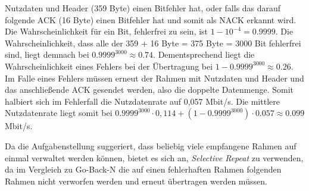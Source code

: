 \documentclass{../exercisesheet}
\begin{document}
\begin{exercise}{4}
\begin{subexercise}
	Nutzdaten und Header (359 Byte) einen Bitfehler hat, oder falls das darauf folgende ACK (16 Byte) einen Bitfehler hat und somit als NACK erkannt wird. Die Wahrscheinlichkeit
	für ein Bit, fehlerfrei zu sein, ist $1-10^{-4}=0.9999$. Die Wahrscheinlichkeit, dass alle der 359 + 16 Byte = 375 Byte = 3000 Bit fehlerfrei sind, liegt demnach bei
	$0.9999^{3000}\approx 0.74$. Dementsprechend liegt die Wahrscheinlichkeit eines Fehlers bei der Übertragung bei $1-0.9999^{3000}\approx 0.26$. Im Falle eines Fehlers
	müssen erneut der Rahmen mit Nutzdaten und Header und das anschließende ACK gesendet werden, also die doppelte Datenmenge. Somit halbiert sich im Fehlerfall
	die Nutzdatenrate auf 0,057 Mbit/s. Die mittlere Nutzdatenrate liegt somit bei $0.9999^{3000} \cdot 0,114 + (1-0.9999^{3000}) \cdot 0.057 \approx 0.099$ Mbit/s.
\end{subexercise}
\begin{subexercise}
	Da die Aufgabenstellung suggeriert, dass beliebig viele empfangene Rahmen auf einmal verwaltet werden können, bietet es sich an, \textit{Selective Repeat} zu verwenden,
	da im Vergleich zu Go-Back-N die auf einen fehlerhaften Rahmen folgenden Rahmen nicht verworfen werden und erneut übertragen werden müssen.
\end{subexercise}
\end{exercise}
\end{document}
